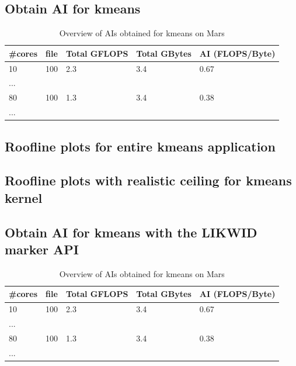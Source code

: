\subsection{Obtain AI for kmeans}

\begin{table}[h]
\centering
\caption{\label{tab:ai_tab}Overview of AIs obtained for kmeans on Mars}
\begin{small}
\begin{tabular}{lllll}
\toprule
\#cores & file & Total GFLOPS & Total GBytes & AI (FLOPS/Byte) \\
\midrule
10 & 100 & 2.3 & 3.4 & 0.67 \\
...\\
80 & 100 & 1.3 & 3.4 & 0.38 \\
...\\
\bottomrule
\end{tabular}
\end{small}
\end{table}

\subsection{Roofline plots for entire kmeans application}

\subsection{Roofline plots with realistic ceiling for kmeans kernel}

\subsection{Obtain AI for kmeans with the LIKWID marker API}

\begin{table}[h]
\centering
\caption{\label{tab:ai_tab}Overview of AIs obtained for kmeans on Mars}
\begin{small}
\begin{tabular}{lllll}
\toprule
\#cores & file & Total GFLOPS & Total GBytes & AI (FLOPS/Byte) \\
\midrule
10 & 100 & 2.3 & 3.4 & 0.67 \\
...\\
80 & 100 & 1.3 & 3.4 & 0.38 \\
...\\
\bottomrule
\end{tabular}
\end{small}
\end{table}

